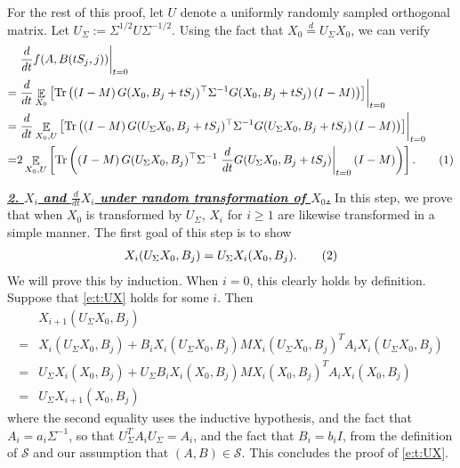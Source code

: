 \documentclass{article}
\DeclareMathOperator{\E}{\mathbb{E}}
\renewcommand{\S}{{\mathcal S}}
\newcommand{\emphh}[1]{\textbf{\emph{#1}}}
\DeclareMathOperator{\tr}{Tr}
\newcommand*\lrb[1]{\left[ #1 \right]}
\newcommand*\lrp[1]{\left( #1 \right)}
\newcommand\numberthis{\addtocounter{equation}{1}\tag{\theequation}}
\newcommand*\at[2]{\left.#1\right|_{#2}}
\newcommand{\US}{U_\Sigma}
\begin{document}
For the rest of this proof, let $U$ denote a uniformly randomly sampled orthogonal matrix. Let $\US:= \Sigma^{1/2} U \Sigma^{-1/2}$. Using the fact that $X_0 \overset{d}{=} \US X_0$, we can verify
\begin{align*}
& \at{\frac{d}{dt} f(A, B(tS_j,j))}{t=0}\\
=& \at{\frac{d}{dt}\E_{X_0} \lrb{\tr\lrp{\lrp{I-M} G(X_0, B_j + t S_j)^\top \Sigma^{-1} G( X_0, B_j + t S_j) \lrp{I-M}}}}{t=0}\\
=& \at{\frac{d}{dt}\E_{X_0, U} \lrb{\tr\lrp{\lrp{I-M} G(\US X_0, B_j + t S_j)^\top \Sigma^{-1} G(\US X_0, B_j + t S_j) \lrp{I-M}}}}{t=0}\\
=& 2\E_{X_0, U} \lrb{\tr\lrp{\lrp{I-M} G(\US X_0, B_j )^\top \Sigma^{-1} \at{\frac{d}{dt} G(\US X_0, B_j + t S_j)}{t=0} \lrp{I-M}}}.
\numberthis \label{e:t:rmlsdm:0}
\end{align*}


\underline{\emphh{2. $X_i$ and $\frac{d}{dt} X_i$ under random transformation of $X_0$.}} In this step, we prove that when $X_0$ is transformed by $\US$, $X_i$ for $i\geq 1$ are likewise transformed in a simple manner. The first goal of this step is to show
\begin{align*}
X_i(\US X_0, B_j) = \US X_i(X_0, B_j).
\numberthis \label{e:t:UX}
\end{align*}
We will prove this by induction. When $i=0$, this clearly holds by definition. Suppose that \eqref{e:t:UX} holds for some $i$. Then
\begin{align*}
& X_{i+1}(\US X_0, B_j)\\
=& X_i(\US X_0, B_j) + B_i X_i(\US X_0, B_j) M X_i(\US X_0, B_j)^T A_i X_i(\US X_0, B_j) \\
=& \US X_i(X_0, B_j) + \US B_i X_i(X_0, B_j) M X_i(X_0, B_j)^T A_i X_i(X_0, B_j)\\
=& \US X_{i+1} (X_0, B_j)
\end{align*}
where the second equality uses the inductive hypothesis, and the fact that $A_i = a_i \Sigma^{-1}$, so that $\US^T A_i \US = A_i$, and the fact that $B_i = b_i I$, from the definition of $\S$ and our assumption that $(A,B)\in \S$. This concludes the proof of \eqref{e:t:UX}.
\end{document}
